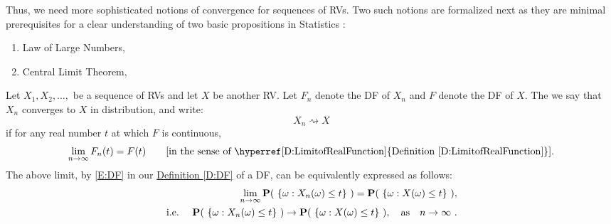 Thus, we need more sophisticated notions of convergence for sequences of RVs.  Two such notions are formalized next as they are minimal prerequisites for a clear understanding of two basic propositions in Statistics :
\begin{enumerate} 
\item Law of Large Numbers,
\item Central Limit Theorem,
\end{enumerate}

\begin{definition}\label{D:ConvInDist}
Let $X_1,X_2,\ldots,$ be a sequence of RVs and let $X$ be another RV.  Let $F_n$ denote the DF of $X_n$ and $F$ denote the DF of $X$.  The we say that $X_n$ converges to $X$ in distribution, and write:
\[
X_n \rightsquigarrow X
\]
if for any real number $t$ at which $F$ is continuous,
\[
\lim_{n \rightarrow \infty} F_n(t) = F(t) \qquad \text{[in the sense of \hyperref[D:LimitofRealFunction]{Definition \ref*{D:LimitofRealFunction}}].}
\]
The above limit, by \eqref{E:DF} in our \hyperref[D:DF]{Definition \ref*{D:DF}} of a DF, can be equivalently expressed as follows: 
\begin{eqnarray}
& & \lim_{n \rightarrow \infty} \mathbf{P}( \ \{\omega: X_n(\omega) \leq  t \} \ )= 
\mathbf{P}( \ \{\omega: X(\omega) \leq  t \} \ ), \notag \\
&\text{i.e.~} & \mathbf{P}( \ \{\omega: X_n(\omega) \leq t \} \ ) \rightarrow \mathbf{P}( \ \{\omega: X(\omega) \leq  t \} \ ), \quad \text{as} \quad n \rightarrow \infty \notag \ .
\end{eqnarray}
\end{definition}

